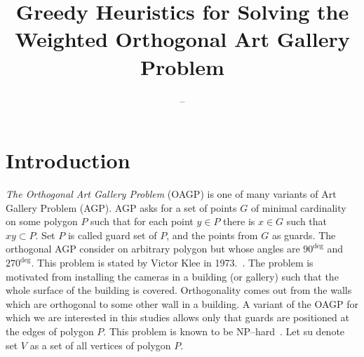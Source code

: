 \documentclass[runningheads,a4paper]{llncs}
\begin{document}
    \mainmatter  %

    \title{Greedy Heuristics for Solving the Weighted Orthogonal Art Gallery Problem}

    \author{--}

    \institute{%
    }

    \maketitle


    \section{Introduction}\label{sec:introduction}
     \emph{The Orthogonal Art Gallery Problem} (OAGP) is one of many variants of Art Gallery Problem (AGP). AGP asks for a set of points $G$ of minimal cardinality on some polygon $P$ such that for each point $y \in P$ there is $x \in G$ such that $xy \subset P$.  Set $P$ is called guard set of $P$, and the points from $G$ as guards. The orthogonal AGP consider on arbitrary polygon but whose angles are $90^{\deg}$ and $270^{\deg}$. This problem is stated by Victor  Klee in 1973.~\cite{o1987art}. The problem is motivated from installing the cameras in a building (or gallery) such that the whole surface of the building is covered. Orthogonality comes out from the walls which are orthogonal to some other wall in a building. A variant of the OAGP for which we are interested in this studies allows only that guards are positioned at the edges of polygon $P$. This problem is known to be NP--hard~\cite{devadoss2011discrete}. Let su denote set $V$ as a set of all vertices of polygon $P$.
     
\end{document}
